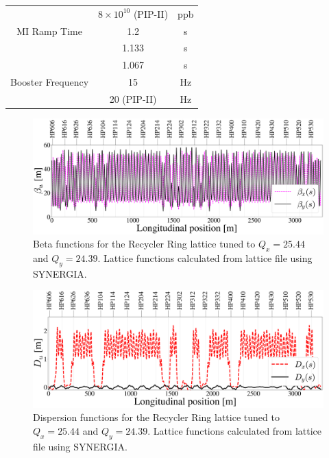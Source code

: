 \begin{table}[H]
\begin{tabular}{@{}ccc@{}}
                            & $8\times10^{10}$ (PIP-II)                  & ppb           \\
MI Ramp Time                & 1.2                                        & s             \\
                            & 1.133                                      & s             \\
                            & 1.067                                      & s             \\
Booster Frequency           & 15                                         & Hz            \\
                            & 20 (PIP-II)                                & Hz            \\ \bottomrule
\end{tabular}
\end{table}

\begin{figure}[H]
   \centering
   \includegraphics[width=\columnwidth]{chapter3/betas.png}
   \caption{Beta functions for the Recycler Ring lattice tuned to $Q_x=25.44$ and $Q_y=24.39$. Lattice functions calculated from lattice file using SYNERGIA.}
   \label{fig:rrbetas}
\end{figure}

\begin{figure}[H]
   \centering
   \includegraphics[width=\columnwidth]{chapter3/disps.png}
   \caption{Dispersion functions for the Recycler Ring lattice tuned to $Q_x=25.44$ and $Q_y=24.39$. Lattice functions calculated from lattice file using SYNERGIA.}
   \label{fig:rrdisps}
\end{figure}

